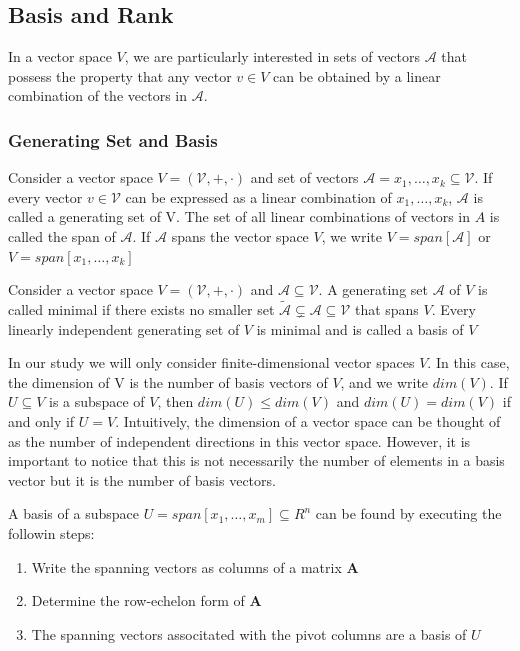\subsection*{Basis and Rank}
In a vector space $V$, we are particularly interested in sets of vectors $\mathcal{A}$ that possess the property that any vector $v \in V$ can be obtained by a linear combination of the vectors in $\mathcal{A}$.
\subsubsection*{Generating Set and Basis}
\begin{definition}
    Consider a vector space $V = (\mathcal{V},+,\cdot)$ and set of vectors $\mathcal{A} = {x_1,\ldots,x_k} \subseteq \mathcal{V}$. If every vector $v \in \mathcal{V}$ can be expressed as a linear combination of $x_1, \ldots, x_k$, $\mathcal{A}$ is called a generating set of V. The set of all linear combinations of vectors in $A$ is called the span of $\mathcal{A}$. If $\mathcal{A}$ spans the vector space $V$, we write $V = span[\mathcal{A}]$ or $V = span[x_1,\ldots,x_k]$
\end{definition}
\begin{definition}[Basis]
    Consider a vector space $V = (\mathcal{V},+,\cdot)$ and $\mathcal{A} \subseteq \mathcal{V}$. A generating set $\mathcal{A}$ of $V$ is called minimal if there exists no smaller set $\tilde{\mathcal{A}}\subsetneq \mathcal{A} \subseteq \mathcal{V}$ that spans $V$. Every linearly independent generating set of $V$ is minimal and is called a basis of $V$
\end{definition}
In our study we will only consider finite-dimensional vector spaces $V$. In this case, the dimension of V is the number of basis vectors of $V$, and we write $dim(V)$. If $U\subseteq V$ is a subspace of $V$, then $dim(U) \leq dim(V)$ and $dim(U) = dim(V)$ if and only if $U=V$. Intuitively, the dimension of a vector space can be thought of as the number of independent directions in this vector space. However, it is important to notice that this is not necessarily the number of elements in a basis vector but it is the number of basis vectors.
\begin{remark}
    A basis of a subspace $U = span[x_1,\ldots,x_m] \subseteq R^n$ can be found by executing the followin steps:
    \begin{enumerate}
        \item Write the spanning vectors as columns of a matrix $\mathbf{A}$
        \item Determine the row-echelon form of $\mathbf{A}$
        \item The spanning vectors associtated with the pivot columns are a basis of $U$
    \end{enumerate}
\end{remark}

